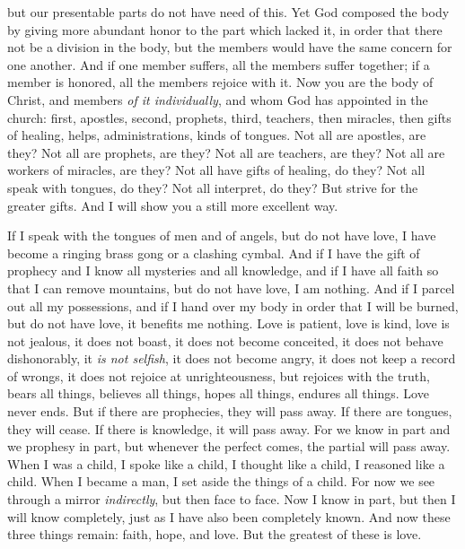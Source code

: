 \begin{biblechapter}
\verse but our presentable parts do not have need of this. Yet God composed the body by giving more abundant honor to the part which lacked it,
\verse in order that there not be a division in the body, but the members would have the same concern for one another.
\verse And if one member suffers, all the members suffer together; if a member is honored, all the members rejoice with it.
\verse Now you are the body of Christ, and members \textit{of it individually},
\verse and whom God has appointed in the church: first, apostles, second, prophets, third, teachers, then miracles, then gifts of healing, helps, administrations, kinds of tongues.
\verse Not all are apostles, are they? Not all are prophets, are they? Not all are teachers, are they? Not all are workers of miracles, are they?
\verse Not all have gifts of healing, do they? Not all speak with tongues, do they? Not all interpret, do they?
\verse But strive for the greater gifts. And I will show you a still more excellent way.
\end{biblechapter}

\begin{biblechapter} %
 If I speak with the tongues of men and of angels, but do not have love, I have become a ringing brass gong or a clashing cymbal.
\verse And if I have the gift of prophecy and I know all mysteries and all knowledge, and if I have all faith so that I can remove mountains, but do not have love, I am nothing.
\verse And if I parcel out all my possessions, and if I hand over my body in order that I will be burned, but do not have love, it benefits me nothing.
\verse Love is patient, love is kind, love is not jealous, it does not boast, it does not become conceited,
\verse it does not behave dishonorably, it \textit{is not selfish}, it does not become angry, it does not keep a record of wrongs,
\verse it does not rejoice at unrighteousness, but rejoices with the truth,
\verse bears all things, believes all things, hopes all things, endures all things.
\verse Love never ends. But if there are prophecies, they will pass away. If there are tongues, they will cease. If there is knowledge, it will pass away.
\verse For we know in part and we prophesy in part,
\verse but whenever the perfect comes, the partial will pass away.
\verse When I was a child, I spoke like a child, I thought like a child, I reasoned like a child. When I became a man, I set aside the things of a child.
\verse For now we see through a mirror \textit{indirectly}, but then face to face. Now I know in part, but then I will know completely, just as I have also been completely known.
\verse And now these three things remain: faith, hope, and love. But the greatest of these is love.
\end{biblechapter}

